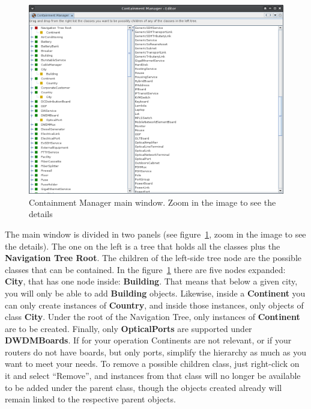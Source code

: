 \documentclass[a4paper]{article}
\begin{document}
	\begin{figure}[h!]
		\centering
		\includegraphics[width=0.7\linewidth]{img/containment_manager.png}
		\caption{Containment Manager main window. Zoom in the image to see the details}
		\label{fig:containment_manager}
	\end{figure}
	The main window is divided in two panels (see figure~\ref{fig:containment_manager}, zoom in the image to see the details). The one on the left is a tree that holds all the classes plus the \textbf{Navigation Tree Root}. The children of the left-side tree node are the possible classes that can be contained. In the figure~\ref{fig:containment_manager} there are five nodes expanded: \textbf{City}, that has one node inside: \textbf{Building}. That means that below a given city, you will only be able to add \textbf{Building} objects. Likewise, inside a \textbf{Continent} you can only create instances of \textbf{Country}, and inside those instances, only objects of class \textbf{City}. Under the root of the Navigation Tree, only instances of \textbf{Continent} are to be created. Finally, only \textbf{OpticalPorts} are supported under \textbf{DWDMBoards}. If for your operation Continents are not relevant, or if your routers do not have boards, but only ports, simplify the hierarchy as much as you want to meet your needs. To remove a possible children class, just right-click on it and select “Remove”, and instances from that class will no longer be available to be added under the parent class, though the objects created already will remain linked to the respective parent objects.
\end{document}
